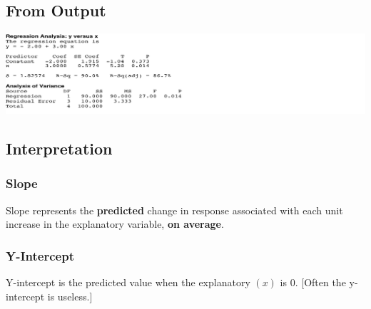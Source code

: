 \documentclass[9pt, oneside]{extarticle}   	%
\begin{document}

\subsection{From Output} %
\label{sub:from_output}
\includegraphics[width=1\textwidth]{img/5_RegOut}\\[.25in]

\subsection{Interpretation} %
\label{sub:interpretation}
\subsubsection{Slope}
Slope represents the  \textbf{predicted} change in response associated with each unit increase in the explanatory variable, \textbf{on average}.\\[.25in]
\subsubsection{Y-Intercept}
Y-intercept is the predicted value when the explanatory $(x)$ is 0. [Often the y-intercept is useless.]
\end{document}
